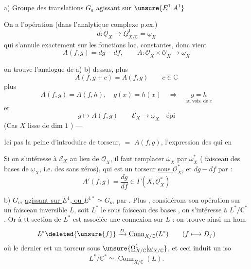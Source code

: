 a) \uline{Groupe des translations} $G_a$ \uline{agissant sur $\unsure{\underline{E}^{1}|\underline{A}^{1}}$}

On a l'opération (dans l'analytique complexe
p.ex.)
\[
d:\underline{\mathcal{O}}_X\longrightarrow\underline{\Omega}^{1}_{X/\mathbb{C}}
=\underline{\omega}_X
\]
qui 
s'annule exactement sur les fonctions
loc. constantes, donc vient
\[
A(f,g)=dg-df,\qquad
A:\underline{\mathcal{O}}_X\times\underline{\mathcal{O}}_X
\longrightarrow\underline{\omega}_X
\]

on trouve l'analogue de a) b) dessus,
plus
\[
A(f,g+c)=A(f,g)\qquad c\in\mathbb{C}
\]
plus
\[
A(f,g)=A(f,h),\quad g(x)=h(x)\quad\Longrightarrow\quad
\underset{\text{au vois. de }x}{g=h}
\]
et
\[
g\longmapsto A(f,g)\qquad
\mathcal{E}_X\longrightarrow\underline{\omega}_X\quad\text{épi}
\]
(Cas $X$ lisse de dim $1$ ) ---

Ici pas la peine d'introduire de torseur,
 $=$ $A(f,g)$,  l'expression
des   qui en 

Si on s'intéresse à $\mathcal E_X$ au lieu de $\underline{\mathcal O}_X$,
il faut remplacer $\underline\omega_X$ par $\underline\omega_X^*$
( faisceau des bases de $\underline\omega_X$, i.e. des
 sans zéros), qui est un torseur
\uline{sous $\underline{\mathcal O}_X^*$}, et $dg-df$ par
 :
\[
A'(f,g)=\frac{dg}{df}\in\Gamma(X,\underline{\mathcal O}_X^*)
\]

b) $G_m$ \uline{agissant sur $\underline E^1$, ou
$\underline E^{1*}\simeq G_m$} par 
. Plus , considérons
son opération sur un faisceau inversible $L$, soit $L^*$ le sous faisceau
des bases ,
on s'intéresse à $L^*/\mathbb C^*$. Or à tt section de $L^*$ est associée
une connexion sur $L$ : on trouve ainsi un hom
\[
L^*\deleted{\unsure{f}}\xrightarrow{D}
\underline{\operatorname{Conn}}_{X/\mathbb C}(L^*)
\qquad(f\longmapsto D_f)
\]
où le dernier est un torseur sous
$\unsure{\underline\Omega^1_{X/\mathbb C}|\underline\omega_{X/\mathbb C}}$,
et ceci induit un  iso
\[
L^*/\mathbb C^*\simeq\underline{\operatorname{Conn}}_{X/\mathbb C}(L).
\]

